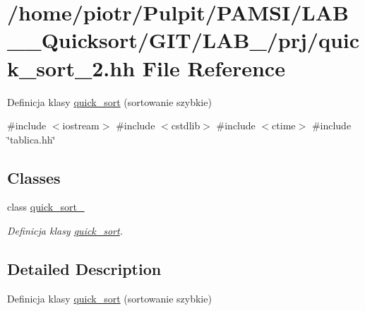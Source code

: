 \hypertarget{quick__sort__2_8hh}{\section{/home/piotr/\-Pulpit/\-P\-A\-M\-S\-I/\-L\-A\-B\-\_\-\_\-\-Quicksort/\-G\-I\-T/\-L\-A\-B\-\_/prj/quick\-\_\-sort\-\_\-2.hh \-File \-Reference}
\label{quick__sort__2_8hh}
}


\-Definicja klasy \hyperlink{classquick__sort}{quick\-\_\-sort} (sortowanie szybkie)  


{\ttfamily \#include $<$iostream$>$}\*
{\ttfamily \#include $<$cstdlib$>$}\*
{\ttfamily \#include $<$ctime$>$}\*
{\ttfamily \#include \char`\"{}tablica.\-hh\char`\"{}}\*
\subsection*{\-Classes}
\begin{DoxyCompactItemize}
\item 
class \hyperlink{classquick__sort__2}{quick\-\_\-sort\-\_}
\begin{DoxyCompactList}\small\item\em \-Definicja klasy \hyperlink{classquick__sort}{quick\-\_\-sort}. \end{DoxyCompactList}\end{DoxyCompactItemize}


\subsection{\-Detailed \-Description}
\-Definicja klasy \hyperlink{classquick__sort}{quick\-\_\-sort} (sortowanie szybkie) 